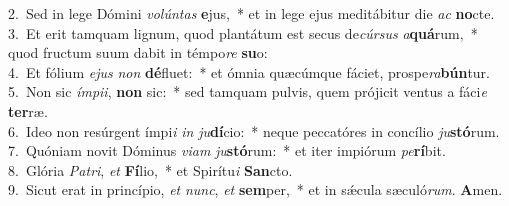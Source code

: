 {2.~}Sed in lege Dómini \textit{vo}\textit{lún}\textit{tas} \textbf{e}jus,~* et in lege ejus meditábitur die \textit{ac} \textbf{no}cte.\\
{3.~}Et erit tamquam lignum, quod plantátum est secus de\textit{cúr}\textit{sus} \textit{a}\textbf{quá}rum,~* quod fructum suum dabit in témpo\textit{re} \textbf{su}o:\\
{4.~}Et fólium \textit{e}\textit{jus} \textit{non} \textbf{dé}fluet:~* et ómnia quæcúmque fáciet, prospe\textit{ra}\textbf{bún}tur.\\
{5.~}Non sic \textit{ím}\textit{pi}\textit{i}, \textbf{non} sic:~* sed tamquam pulvis, quem prójicit ventus a fáci\textit{e} \textbf{ter}ræ.\\
{6.~}Ideo non resúrgent ímpi\textit{i} \textit{in} \textit{ju}\textbf{dí}cio:~* neque peccatóres in concílio \textit{ju}\textbf{stó}rum.\\
{7.~}Quóniam novit Dóminus \textit{vi}\textit{am} \textit{ju}\textbf{stó}rum:~* et iter impiórum \textit{pe}\textbf{rí}bit.\\
{8.~}Glória \textit{Pa}\textit{tri}, \textit{et} \textbf{Fí}lio,~* et Spirítu\textit{i} \textbf{San}cto.\\
{9.~}Sicut erat in princípio, \textit{et} \textit{nunc}, \textit{et} \textbf{sem}per,~* et in sǽcula sæculó\textit{rum}. \textbf{A}men.\\
